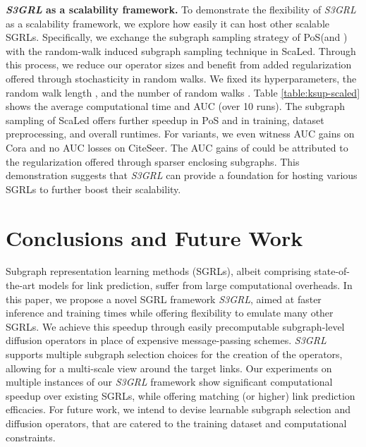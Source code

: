 \documentclass[sigconf, nonacm]{acmart}
\newcommand{\posplus}{\xspace}
\newcommand{\pos}{{P\lowercase{o}S}\xspace}
\newcommand{\ssgrl}{\textit{S3GRL}\xspace}
\newcommand{\scaled}{S\lowercase{ca}L\lowercase{ed}\xspace}
\begin{document}
\vskip 1mm
\noindent \textbf{\ssgrl as a scalability framework.}
To demonstrate the flexibility of \ssgrl as a scalability framework, we explore how easily it can host other scalable SGRLs. Specifically, we exchange the subgraph sampling strategy of \pos (and \posplus) with the random-walk induced subgraph sampling technique in \scaled. Through this process, we reduce our operator sizes and benefit from added regularization offered through stochasticity in random walks. We fixed its hyperparameters, the random walk length , and the number of random walks . Table \ref{table:ksup-scaled} shows the average computational time and AUC (over 10 runs).  The subgraph sampling of \scaled offers further speedup in \pos and \posplus in training, dataset preprocessing, and overall runtimes. For \posplus variants, we even witness AUC gains on Cora and no AUC losses on CiteSeer. The AUC gains of \posplus could be attributed to the regularization offered through sparser enclosing subgraphs. This demonstration suggests that \ssgrl can provide a foundation for hosting various SGRLs to further boost their scalability. 


\section{Conclusions and Future Work}
Subgraph representation learning methods (SGRLs), albeit comprising state-of-the-art models for link prediction, suffer from large computational overheads. In this paper, we propose a novel SGRL framework \ssgrl, aimed at faster inference and training times while offering flexibility to emulate many other SGRLs. We achieve this speedup through easily precomputable subgraph-level diffusion operators in place of expensive message-passing schemes. \ssgrl supports multiple subgraph selection choices for the creation of the operators, allowing for a multi-scale view around the target links. Our experiments on multiple instances of our \ssgrl framework show significant computational speedup over existing SGRLs, while offering matching (or higher) link prediction efficacies. For future work, we intend to devise learnable subgraph selection and diffusion operators, that are catered to the training dataset and computational constraints.





\end{document}
